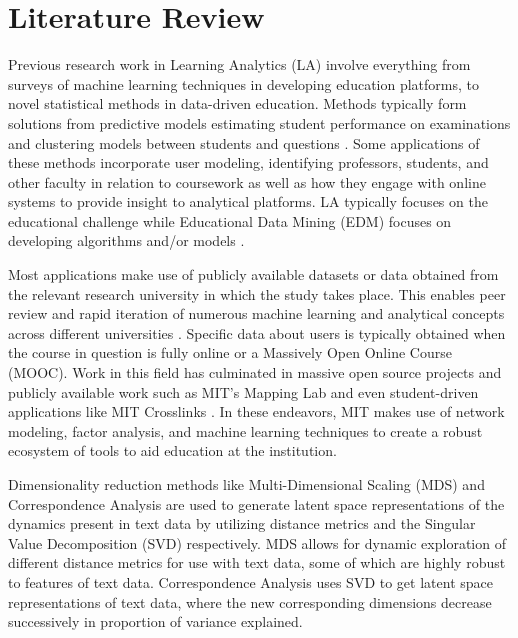 %
%
%

\chapter{Literature Review}
\label{literature-review}





\indent Previous research work in Learning Analytics (LA) involve everything from surveys of machine learning techniques in developing education platforms, to novel 
statistical methods in data-driven education. Methods typically form solutions from predictive models estimating student performance on examinations and clustering models between students and questions \cite{barbu_data_nodate}. Some applications of these methods incorporate user modeling, identifying professors, students, and other faculty in relation to coursework as well as how they engage with online systems to provide insight to analytical platforms. LA typically focuses on the educational challenge while Educational Data Mining (EDM) focuses on developing algorithms and/or models \cite{hilliger_evaluating_2019}.

\indent Most applications make use of publicly available datasets  or data obtained from the relevant research university in which the 
study takes place. This enables peer review and rapid iteration of numerous machine learning and analytical concepts across different universities \cite{barbu_data_nodate}
\cite{romero_educational_2020}\cite{hilliger_evaluating_2019}.  Specific data about users is typically obtained when the course in question is fully online or a Massively 
Open Online Course (MOOC). Work in this field has culminated in massive open source projects and publicly available work such as MIT’s Mapping Lab and even student-driven 
applications like MIT Crosslinks \cite{willcox_network_2017}. In these endeavors, MIT makes use of network modeling,  factor analysis, and machine learning techniques to 
create a robust ecosystem of tools to aid education at the institution. 

Dimensionality reduction methods like Multi-Dimensional Scaling (MDS) \cite{jjs} and Correspondence Analysis are used to generate latent space representations of the dynamics 
present in text data by utilizing distance metrics and the Singular Value Decomposition (SVD) respectively.  MDS allows for dynamic exploration of different distance metrics 
for use with text data, some of which are highly robust to features of text data.  Correspondence Analysis uses SVD to get latent space representations of text data,  where 
the new corresponding dimensions decrease successively in proportion of variance explained. 

